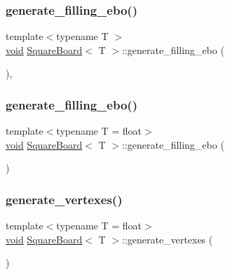 \subsubsection{\texorpdfstring{generate\+\_\+filling\+\_\+ebo()}{generate\_filling\_ebo()}\hspace{0.1cm}{\footnotesize\ttfamily [1/2]}}
{\footnotesize\ttfamily template$<$typename T $>$ \\
\mbox{\hyperlink{glad_8h_a950fc91edb4504f62f1c577bf4727c29}{void}} \mbox{\hyperlink{classSquareBoard}{Square\+Board}}$<$ T $>$\+::generate\+\_\+filling\+\_\+ebo (\begin{DoxyParamCaption}{ }\end{DoxyParamCaption})\hspace{0.3cm}{\ttfamily [inline]}, {\ttfamily [private]}}

\mbox{\label{classSquareBoard_a5d12432cc063275a6ffec42a7971abbc}} 
\subsubsection{\texorpdfstring{generate\+\_\+filling\+\_\+ebo()}{generate\_filling\_ebo()}\hspace{0.1cm}{\footnotesize\ttfamily [2/2]}}
{\footnotesize\ttfamily template$<$typename T  = float$>$ \\
\mbox{\hyperlink{glad_8h_a950fc91edb4504f62f1c577bf4727c29}{void}} \mbox{\hyperlink{classSquareBoard}{Square\+Board}}$<$ T $>$\+::generate\+\_\+filling\+\_\+ebo (\begin{DoxyParamCaption}{ }\end{DoxyParamCaption})\hspace{0.3cm}{\ttfamily [private]}}

\mbox{\label{classSquareBoard_a401c48fa5977d166b75e94bb7ddf1db7}} 
\subsubsection{\texorpdfstring{generate\+\_\+vertexes()}{generate\_vertexes()}\hspace{0.1cm}{\footnotesize\ttfamily [1/4]}}
{\footnotesize\ttfamily template$<$typename T  = float$>$ \\
\mbox{\hyperlink{glad_8h_a950fc91edb4504f62f1c577bf4727c29}{void}} \mbox{\hyperlink{classSquareBoard}{Square\+Board}}$<$ T $>$\+::generate\+\_\+vertexes (\begin{DoxyParamCaption}{ }\end{DoxyParamCaption})\hspace{0.3cm}{\ttfamily [private]}}

